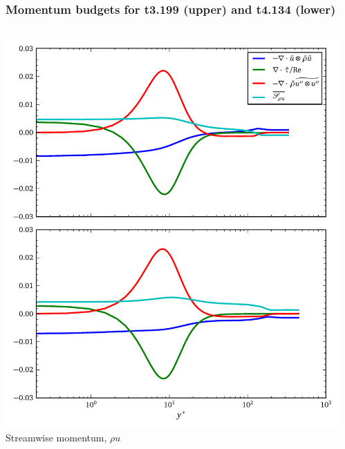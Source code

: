 \documentclass[mathserif]{beamer}
\begin{document}
\begin{frame}
    \frametitle{Momentum budgets for t3.199 (upper) and t4.134 (lower)}
    \begin{columns}
        \begin{column}{0.5\linewidth}
          \centering
          \includegraphics[width=\textwidth]{hqd_fans_rho_u}
          \\\vspace{-0.5em}
          Streamwise momentum, $\rho u$
        \end{column}
        \begin{column}{0.5\linewidth}
          \centering

\end{column}
\end{columns}
\end{frame}
\end{document}

